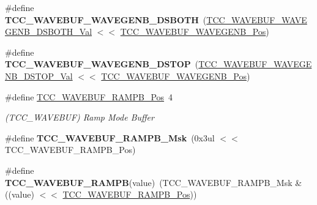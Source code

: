 \begin{DoxyCompactItemize}
\item 
\hypertarget{group___s_a_m_l21___t_c_c_gacb6457eda7bf88879eb3ca27d9f185ad}{}\#define {\bfseries T\+C\+C\+\_\+\+W\+A\+V\+E\+B\+U\+F\+\_\+\+W\+A\+V\+E\+G\+E\+N\+B\+\_\+\+D\+S\+B\+O\+T\+H}~(\hyperlink{group___s_a_m_l21___t_c_c_gaafe6b0dfcafc16e75923cea4ab69b166}{T\+C\+C\+\_\+\+W\+A\+V\+E\+B\+U\+F\+\_\+\+W\+A\+V\+E\+G\+E\+N\+B\+\_\+\+D\+S\+B\+O\+T\+H\+\_\+\+Val} $<$$<$ \hyperlink{group___s_a_m_l21___t_c_c_ga873098e9f57606f2bb54409caa7482f9}{T\+C\+C\+\_\+\+W\+A\+V\+E\+B\+U\+F\+\_\+\+W\+A\+V\+E\+G\+E\+N\+B\+\_\+\+Pos})\label{group___s_a_m_l21___t_c_c_gacb6457eda7bf88879eb3ca27d9f185ad}

\item 
\hypertarget{group___s_a_m_l21___t_c_c_gacc6da69837abee7b08dd2ccfb2847a83}{}\#define {\bfseries T\+C\+C\+\_\+\+W\+A\+V\+E\+B\+U\+F\+\_\+\+W\+A\+V\+E\+G\+E\+N\+B\+\_\+\+D\+S\+T\+O\+P}~(\hyperlink{group___s_a_m_l21___t_c_c_gafb883963871029cc788d00ec9d46331e}{T\+C\+C\+\_\+\+W\+A\+V\+E\+B\+U\+F\+\_\+\+W\+A\+V\+E\+G\+E\+N\+B\+\_\+\+D\+S\+T\+O\+P\+\_\+\+Val} $<$$<$ \hyperlink{group___s_a_m_l21___t_c_c_ga873098e9f57606f2bb54409caa7482f9}{T\+C\+C\+\_\+\+W\+A\+V\+E\+B\+U\+F\+\_\+\+W\+A\+V\+E\+G\+E\+N\+B\+\_\+\+Pos})\label{group___s_a_m_l21___t_c_c_gacc6da69837abee7b08dd2ccfb2847a83}

\item 
\hypertarget{group___s_a_m_l21___t_c_c_gacadfaca67ac00066277794760f4787f5}{}\#define \hyperlink{group___s_a_m_l21___t_c_c_gacadfaca67ac00066277794760f4787f5}{T\+C\+C\+\_\+\+W\+A\+V\+E\+B\+U\+F\+\_\+\+R\+A\+M\+P\+B\+\_\+\+Pos}~4\label{group___s_a_m_l21___t_c_c_gacadfaca67ac00066277794760f4787f5}

\begin{DoxyCompactList}\small\item\em (T\+C\+C\+\_\+\+W\+A\+V\+E\+B\+U\+F) Ramp Mode Buffer \end{DoxyCompactList}\item 
\hypertarget{group___s_a_m_l21___t_c_c_gad9a0fbe44bc13f8440f22fc784455f9b}{}\#define {\bfseries T\+C\+C\+\_\+\+W\+A\+V\+E\+B\+U\+F\+\_\+\+R\+A\+M\+P\+B\+\_\+\+Msk}~(0x3ul $<$$<$ T\+C\+C\+\_\+\+W\+A\+V\+E\+B\+U\+F\+\_\+\+R\+A\+M\+P\+B\+\_\+\+Pos)\label{group___s_a_m_l21___t_c_c_gad9a0fbe44bc13f8440f22fc784455f9b}

\item 
\hypertarget{group___s_a_m_l21___t_c_c_ga0d3e8fa9c782fe1fdb3b84ad895c429b}{}\#define {\bfseries T\+C\+C\+\_\+\+W\+A\+V\+E\+B\+U\+F\+\_\+\+R\+A\+M\+P\+B}(value)~(T\+C\+C\+\_\+\+W\+A\+V\+E\+B\+U\+F\+\_\+\+R\+A\+M\+P\+B\+\_\+\+Msk \& ((value) $<$$<$ \hyperlink{group___s_a_m_l21___t_c_c_gacadfaca67ac00066277794760f4787f5}{T\+C\+C\+\_\+\+W\+A\+V\+E\+B\+U\+F\+\_\+\+R\+A\+M\+P\+B\+\_\+\+Pos}))\label{group___s_a_m_l21___t_c_c_ga0d3e8fa9c782fe1fdb3b84ad895c429b}


\end{DoxyCompactItemize}
